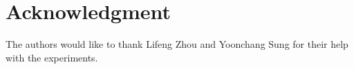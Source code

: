 \documentclass[journal]{IEEEtran}
\begin{document}
\section*{Acknowledgment}
The authors would like to thank Lifeng Zhou and Yoonchang Sung for their help with the experiments.







%
\end{document}
